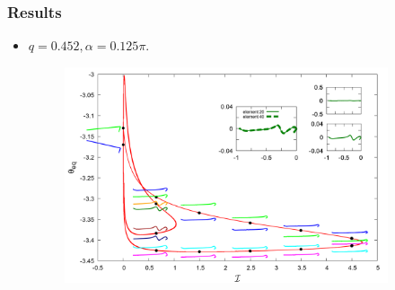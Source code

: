 \documentclass{beamer}
\begin{document}
\begin{frame}
	\frametitle{Results}
	\begin{overlayarea}{\textwidth}{\textheight}
\begin{itemize}
	\item $q=0.452, \alpha=0.125\pi$.
	\begin{figure}[htb]
		\begin{center}
			\includegraphics[width=0.9\textwidth]{plots/combine_elastic_beam_I_theta_q_0.452_alpha_0.125pi_initial_-4.80_0.png}
		\end{center}
	\end{figure}
\end{itemize}
	\end{overlayarea}
\end{frame}

\end{document}
